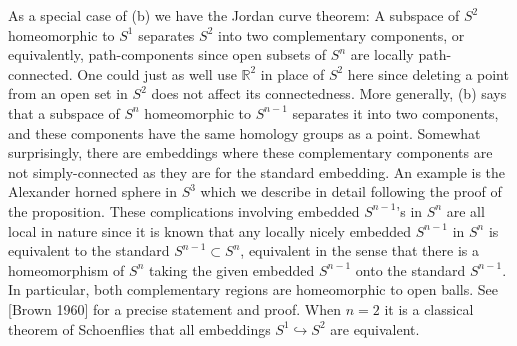 As a special case of (b) we have the Jordan curve theorem: A subspace of $S^2$ homeomorphic to $S^1$ separates $S^2$ into two complementary components, or equivalently, path-components since open subsets of $S^n$ are locally path-connected. One could just as well use $\mathbb{R}^2$ in place of $S^2$ here since deleting a point from an open set in $S^2$ does not affect its connectedness. More generally, (b) says that a subspace of $S^n$ homeomorphic to $S^{n-1}$ separates it into two components, and these components have the same homology groups as a point. Somewhat surprisingly, there are embeddings where these complementary components are not simply-connected as they are for the standard embedding. An example is the Alexander horned sphere in $S^3$ which we describe in detail following the proof of the proposition. These complications involving embedded $S^{n-1}$'s in $S^n$ are all local in nature since it is known that any locally nicely embedded $S^{n-1}$ in $S^n$ is equivalent to the standard $S^{n-1} \subset S^n$, equivalent in the sense that there is a homeomorphism of $S^n$ taking the given embedded $S^{n-1}$ onto the standard $S^{n-1}$. In particular, both complementary regions are homeomorphic to open balls. See [Brown 1960] for a precise statement and proof. When $n = 2$ it is a classical theorem of Schoenflies that all embeddings $S^1 \hookrightarrow S^2$ are equivalent.

